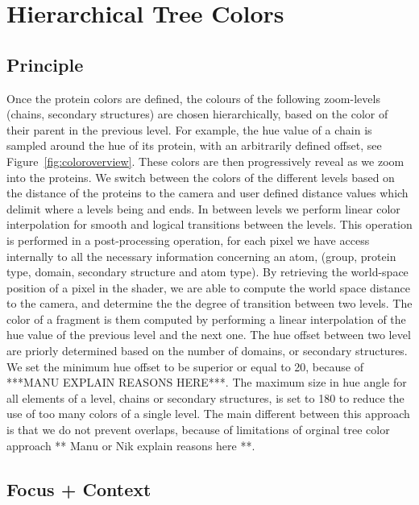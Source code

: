 \documentclass[review,journal]{vgtc}         %
\begin{document}
\section{Hierarchical Tree Colors}

\subsection{Principle}

Once the protein colors are defined, the colours of the following zoom-levels (chains, secondary structures) are chosen hierarchically, based on the color of their parent in the previous level.
For example, the hue value of a chain is sampled around the hue of its protein, with an arbitrarily defined offset, see Figure~\ref{fig:coloroverview}.
These colors are then progressively reveal as we zoom into the proteins.
We switch between the colors of the different levels based on the distance of the proteins to the camera and user defined distance values which delimit where a levels being and ends.
In between levels we perform linear color interpolation for smooth and logical transitions between the levels.
This operation is performed in a post-processing operation, for each pixel we have access internally to all the necessary  information concerning an atom, (group, protein type, domain, secondary structure and atom type).
By retrieving the world-space position of a pixel in the shader, we are able to compute the world space distance to the camera, and determine the the degree of transition between two levels.
The color of a fragment is them computed by performing a linear interpolation of the hue value of the previous level and the next one. 
The hue offset between two level are priorly determined based on the number of domains, or secondary structures.
We set the minimum hue offset to be superior or equal to 20, because of ***MANU EXPLAIN REASONS HERE***.
The maximum size in hue angle for all elements of a level, chains or secondary structures, is set to 180 to reduce the use of too many colors of a single level.
The main different between this approach is that we do not prevent overlaps, because of limitations of orginal tree color approach ** Manu or Nik explain reasons here **.


\subsection{Focus + Context}
\end{document}
